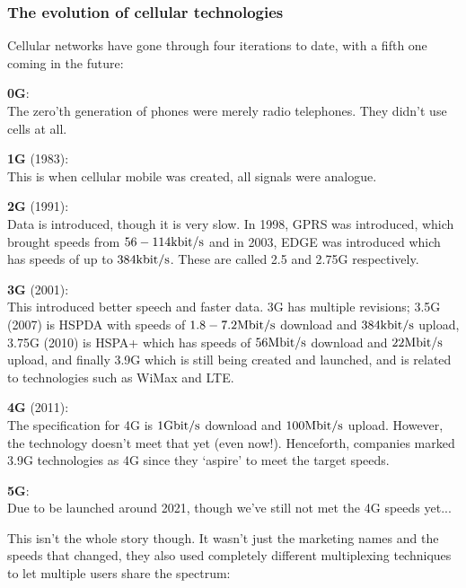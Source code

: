 \subsubsection{The evolution of cellular technologies}

Cellular networks have gone through four iterations to date, with a fifth one
coming in the future:

\begin{description}
  \item \textbf{0G}:\\
  	The zero'th generation of phones were merely radio telephones. They didn't
  	use cells at all.
  \item \textbf{1G} (1983):\\
  	This is when cellular mobile was created, all signals were analogue.
  \item \textbf{2G} (1991):\\
  	Data is introduced, though it is very slow. In 1998, GPRS was introduced,
  	which brought speeds from $56-114\si{\kilo\bit\per\second}$ and in 2003,
  	EDGE was introduced which has speeds of up to
  	$384\si{\kilo\bit\per\second}$. These are called 2.5 and 2.75G respectively.
  \item \textbf{3G} (2001):\\
  	This introduced better speech and faster data. 3G has multiple revisions; 
  	3.5G (2007) is HSPDA with speeds of $1.8-7.2\si{\mega\bit\per\second}$
  	download and $384\si{\kilo\bit\per\second}$ upload, 3.75G (2010) is HSPA+
  	which has speeds of $56\si{\mega\bit\per\second}$ download and 
  	$22\si{\mega\bit\per\second}$ upload, and finally 3.9G which is still being
  	created and launched, and is related to technologies such as WiMax and LTE.
  \item \textbf{4G} (2011):\\
  	The specification for 4G is $1\si{\giga\bit\per\second}$ download and 
  	$100\si{\mega\bit\per\second}$ upload. However, the technology doesn't meet
  	that yet (even now!). Henceforth, companies marked 3.9G technologies as 4G
  	since they `aspire' to meet the target speeds.
  \item \textbf{5G}:\\
  	Due to be launched around 2021, though we've still not met the 4G speeds
  	yet...
\end{description}

This isn't the whole story though. It wasn't just the marketing names and the
speeds that changed, they also used completely different multiplexing techniques
to let multiple users share the spectrum:

